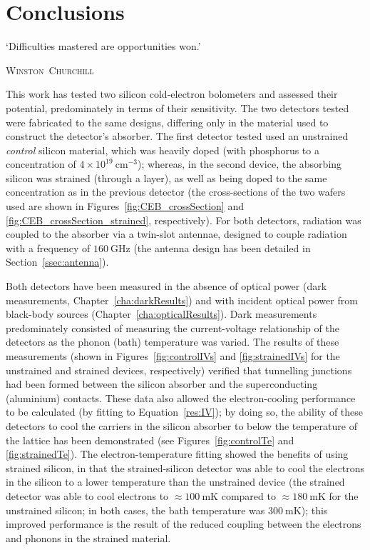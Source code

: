 \chapter{Conclusions}\label{cha:conclusion}
\epigraph{`Difficulties mastered are opportunities won.'}{\mbox{\textup{\textsc{Winston Churchill}}}}
%
This work has tested two silicon cold-electron bolometers and assessed their potential, predominately in terms of their sensitivity. The two detectors tested were fabricated to the same designs, differing only in the material used to construct the detector's absorber. The first detector tested used an unstrained \textit{control} silicon material, which was heavily doped (with phosphorus to a concentration of $4\times 10^{19}~\mathrm{cm^{-3}}$); whereas, in the second device, the absorbing silicon was strained (through a  layer), as well as being doped to the same concentration as in the previous detector (the cross-sections of the two wafers used are shown in Figures~\ref{fig:CEB_crossSection} and \ref{fig:CEB_crossSection_strained}, respectively). For both detectors, radiation was coupled to the absorber via a twin-slot antennae, designed to couple radiation with a frequency of $160~\mathrm{GHz}$ (the antenna design has been detailed in Section~\ref{ssec:antenna}).
\par 
Both detectors have been measured in the absence of optical power (dark measurements, Chapter~\ref{cha:darkResults}) and with incident optical power from black-body sources (Chapter~\ref{cha:opticalResults}). Dark measurements predominately consisted of measuring the current-voltage relationship of the detectors as the phonon (bath) temperature was varied. The results of these measurements (shown in Figures~\ref{fig:controlIVs} and \ref{fig:strainedIVs} for the unstrained and strained devices, respectively) verified that tunnelling junctions had been formed between the silicon absorber and the superconducting (aluminium) contacts. These data also allowed the electron-cooling performance to be calculated (by fitting to Equation~\ref{res:IV}); by doing so, the ability of these detectors to cool the carriers in the silicon absorber to below the temperature of the lattice has been demonstrated (see Figures~\ref{fig:controlTe} and \ref{fig:strainedTe}). The electron-temperature fitting showed the benefits of using strained silicon, in that the strained-silicon detector was able to cool the electrons in the silicon to a lower temperature than the unstrained device (the strained detector was able to cool electrons to $\approx 100~\mathrm{mK}$ compared to $\approx 180~\mathrm{mK}$ for the unstrained silicon; in both cases, the bath temperature was $300~\mathrm{mK}$); this improved performance is the result of the reduced coupling between the electrons and phonons in the strained material.
